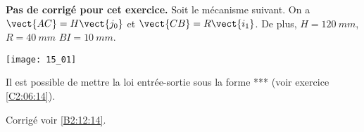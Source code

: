 \normalfalse \difficiletrue \tdifficilefalse
\correctionfalse


\setcounter{question}{0}
\ifcorrection
\else
\textbf{Pas de corrigé pour cet exercice.}
\fi
\ifprof
\else
Soit le mécanisme suivant. On a $\vect{AC}=H\vect{j_0}$ et $\vect{CB}=R\vect{i_1}$. De plus, 
$H=\SI{120}{mm}$, $R=\SI{40}{mm}$ $BI=\SI{10}{mm}$.

\begin{center}
\texttt{[image: 15\_01]}
\end{center}
\fi


Il est possible de mettre la loi entrée-sortie sous la forme *** (voir exercice \ref{C2:06:14}).

\ifprof
\else
\fi

\ifprof
\else
\fi


\ifprof
\else
\begin{flushright}
\footnotesize{Corrigé  voir \ref{B2:12:14}.}
\end{flushright}%
\fi